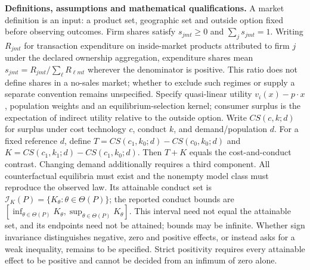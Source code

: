 \documentclass[11pt,a4paper]{article}
\begin{document}
\textbf{Definitions, assumptions and mathematical qualifications.} A market definition is an input: a product set, geographic set and outside option fixed before observing outcomes. Firm shares satisfy \(s_{jmt}\geq0\) and \(\sum_j s_{jmt}=1\). Writing \(R_{jmt}\) for transaction expenditure on inside-market products attributed to firm \(j\) under the declared ownership aggregation, expenditure shares mean \(s_{jmt}=R_{jmt}/\sum_\ell R_{\ell mt}\) wherever the denominator is positive. This ratio does not define shares in a no-sales market; whether to exclude such regimes or supply a separate convention remains unspecified. Specify quasi-linear utility \(v_i(x)-p\cdot x\), population weights and an equilibrium-selection kernel; consumer surplus is the expectation of indirect utility relative to the outside option. Write \(CS(c,k;d)\) for surplus under cost technology \(c\), conduct \(k\), and demand/population \(d\). For a fixed reference \(d\), define \(T=CS(c_1,k_0;d)-CS(c_0,k_0;d)\) and \(K=CS(c_1,k_1;d)-CS(c_1,k_0;d)\). Then \(T+K\) equals the cost-and-conduct contrast. Changing demand additionally requires a third component. All counterfactual equilibria must exist and the nonempty model class must reproduce the observed law. Its attainable conduct set is \(\mathcal I_K(P)=\{K_\theta:\theta\in\Theta(P)\}\); the reported conduct bounds are \([\inf_{\theta\in\Theta(P)}K_\theta,\sup_{\theta\in\Theta(P)}K_\theta]\). This interval need not equal the attainable set, and its endpoints need not be attained; bounds may be infinite. Whether sign invariance distinguishes negative, zero and positive effects, or instead asks for a weak inequality, remains to be specified. Strict positivity requires every attainable effect to be positive and cannot be decided from an infimum of zero alone.
\end{document}
